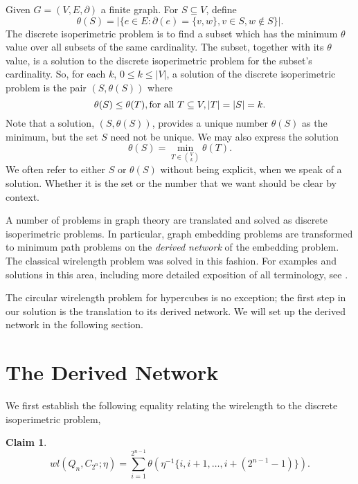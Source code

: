 \documentclass[12pt]{ucthesis}
\theoremstyle{plain}
\newtheorem{claim}{Claim}
\theoremstyle{definition}
\begin{document}
Given $G = (V, E, \partial)$ a finite graph.
For $S \subseteq V$, define
\begin{equation*}
\theta(S) = |\{e \in E \colon \partial(e) = \{v, w\}, v \in S, w \notin S\}|.
\end{equation*}
The discrete isoperimetric problem is to find a subset which has the minimum $\theta$ value
over all subsets of the same cardinality.
The subset, together with its $\theta$ value,
is a solution to the discrete isoperimetric problem for the subset's cardinality.
So, for each $k$, $0 \le k \le |V|$,
a solution of the discrete isoperimetric problem is the pair $(S, \theta(S))$ where
\begin{equation*}
\theta(S) \le \theta(T), \textnormal{for all }T \subseteq V, |T| = |S| = k.
\end{equation*}
Note that a solution, $(S, \theta(S))$,
provides a unique number $\theta(S)$ as the minimum,
but the set $S$ need not be unique.
We may also express the solution
\begin{equation*}
\theta(S) = \min_{T \in \binom{V}{k}} \theta(T).
\end{equation*}
We often refer to either $S$ or $\theta(S)$ without being explicit,
when we speak of a solution.
Whether it is the set or the number that we want should be clear by context.

A number of problems in graph theory are translated and solved as discrete isoperimetric problems.
In particular, graph embedding problems are transformed to minimum path problems
on the \emph{derived network} of the embedding problem.
The classical wirelength problem was solved in this fashion.
For examples and solutions in this area,
including more detailed exposition of all terminology, see \cite{Harper.2004}.

The circular wirelength problem for hypercubes is no exception;
the first step in our solution is the translation to its derived network.
We will set up the derived network in the following section.

\section{The Derived Network}
\label{Section 2.3}

We first establish the following equality relating the wirelength to the discrete isoperimetric problem,
\begin{claim}
\label{Claim 1}
\begin{equation*}
wl(Q_n, C_{2^n}; \eta) = \sum_{i = 1}^{2^{n - 1}} \theta(\eta^{-1}\{i, i + 1, \dots, i + (2^{n - 1} - 1)\}).
\end{equation*}
\end{claim}
\end{document}
